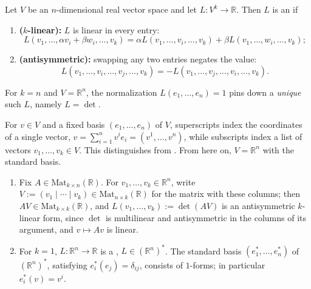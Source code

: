 \begin{definition}
\label{def:antisymmetric_k_linear_form}
Let $V$ be an $n$-dimensional real vector space and let $L : V^k \to \mathbb{R}$. Then $L$ is
an  
if
\begin{enumerate}[label=\textbf{(\alph*)}]
  \item \textbf{($k$-linear):} $L$ is linear in every entry:
  \[L(v_1,\ldots,\alpha v_i+\beta w_i,\ldots,v_k) = \alpha L(v_1,\ldots,v_i,\ldots,v_k)
    + \beta L(v_1,\ldots,w_i,\ldots,v_k);\]
  \item \textbf{(antisymmetric):} swapping any two entries negates the value:
  \[L(v_1,\ldots,v_i,\ldots,v_j,\ldots,v_k) = -L(v_1,\ldots,v_j,\ldots,v_i,\ldots,v_k).\]
\end{enumerate}
\end{definition}

\begin{remark}
For $k=n$ and $V = \mathbb{R}^n$, the normalization $L(e_1,\ldots,e_n) = 1$ pins down a
\emph{unique} such $L$, namely $L = \det$.
\end{remark}

\begin{notation}
For $v \in V$ and a fixed basis $(e_1,\ldots,e_n)$ of $V$, superscripts index the coordinates
of a single vector, $v = \sum_{i=1}^n v^i e_i = (v^1,\ldots,v^n)$, while subscripts index a
list of vectors $v_1,\ldots,v_k \in V$. This distinguishes  from . From here on, $V = \mathbb{R}^n$ with the
standard basis.
\end{notation}

\begin{aiexample}
\begin{enumerate}[label=\textbf{(\alph*)}]
  \item Fix $A \in \mathrm{Mat}_{k\times n}(\mathbb{R})$. For $v_1,\ldots,v_k \in
  \mathbb{R}^n$, write $V := (v_1\mid\cdots\mid v_k) \in \mathrm{Mat}_{n\times k}(\mathbb{R})$
  for the matrix with these columns; then $AV \in \mathrm{Mat}_{k\times k}(\mathbb{R})$, and
  $L(v_1,\ldots,v_k) := \det(AV)$ is an antisymmetric $k$-linear form, since $\det$ is
  multilinear and antisymmetric in the columns of its argument, and $v \mapsto Av$ is linear.
  \item For $k=1$, $L : \mathbb{R}^n \to \mathbb{R}$ is a ,
  $L \in (\mathbb{R}^n)^*$. The standard basis $(e_1^*,\ldots,e_n^*)$ of $(\mathbb{R}^n)^*$,
  satisfying $e_i^*(e_j) = \delta_{ij}$, consists of $1$-forms; in particular
  $e_i^*(v) = v^i$.
\end{enumerate}
\end{aiexample}

